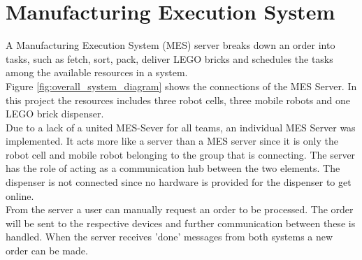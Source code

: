 \chapter{Manufacturing Execution System}\label{chap:mes_server_chapter}

A Manufacturing Execution System (MES) server breaks down an order into tasks, such as fetch, sort, pack, deliver LEGO bricks and schedules the tasks among the available resources in a system. \\

Figure \ref{fig:overall_system_diagram} shows the connections of the MES Server. In this project the resources includes three robot cells, three mobile robots and one LEGO brick dispenser. \\

Due to a lack of a united MES-Sever for all teams, an individual MES Server was implemented. It acts more like a server than a MES server since it is only the robot cell and mobile robot belonging to the group that is connecting. The server has the role of acting as a communication hub between the two elements. The dispenser is not connected since no hardware is provided for the dispenser to get online. \\

From the server a user can manually request an order to be processed. The order will be sent to the respective devices and further communication between these is handled. When the server receives 'done' messages from both systems a new order can be made.



%




